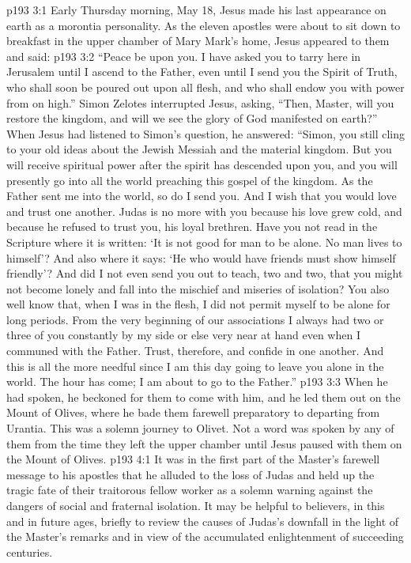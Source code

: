 \vs p193 3:1 Early Thursday morning, May 18, Jesus made his last appearance on earth as a morontia personality. As the eleven apostles were about to sit down to breakfast in the upper chamber of Mary Mark’s home, Jesus appeared to them and said:
\pc \vs p193 3:2 \textcolor{ubdarkred}{“Peace be upon you. I have asked you to tarry here in Jerusalem until I ascend to the Father, even until I send you the Spirit of Truth, who shall soon be poured out upon all flesh, and who shall endow you with power from on high.”} Simon Zelotes interrupted Jesus, asking, “Then, Master, will you restore the kingdom, and will we see the glory of God manifested on earth?” When Jesus had listened to Simon’s question, he answered: \textcolor{ubdarkred}{“Simon, you still cling to your old ideas about the Jewish Messiah and the material kingdom. But you will receive spiritual power after the spirit has descended upon you, and you will presently go into all the world preaching this gospel of the kingdom. As the Father sent me into the world, so do I send you. And I wish that you would love and trust one another. Judas is no more with you because his love grew cold, and because he refused to trust you, his loyal brethren. Have you not read in the Scripture where it is written: ‘It is not good for man to be alone. No man lives to himself’? And also where it says: ‘He who would have friends must show himself friendly’? And did I not even send you out to teach, two and two, that you might not become lonely and fall into the mischief and miseries of isolation? You also well know that, when I was in the flesh, I did not permit myself to be alone for long periods. From the very beginning of our associations I always had two or three of you constantly by my side or else very near at hand even when I communed with the Father. Trust, therefore, and confide in one another. And this is all the more needful since I am this day going to leave you alone in the world. The hour has come; I am about to go to the Father.”}
\pc \vs p193 3:3 When he had spoken, he beckoned for them to come with him, and he led them out on the Mount of Olives, where he bade them farewell preparatory to departing from Urantia. This was a solemn journey to Olivet. Not a word was spoken by any of them from the time they left the upper chamber until Jesus paused with them on the Mount of Olives.\plusone
{}
\vs p193 4:1 It was in the first part of the Master’s farewell message to his apostles that he alluded to the loss of Judas and held up the tragic fate of their traitorous fellow worker as a solemn warning against the dangers of social and fraternal isolation. It may be helpful to believers, in this and in future ages, briefly to review the causes of Judas’s downfall in the light of the Master’s remarks and in view of the accumulated enlightenment of succeeding centuries.
